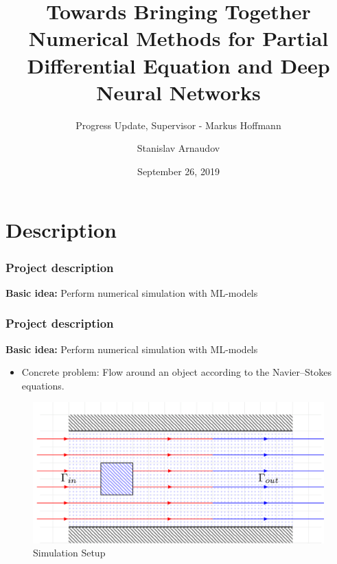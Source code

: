 \documentclass[18pt]{beamer}
\title[Progress Update]{Towards Bringing Together Numerical Methods for Partial Differential Equation and Deep Neural Networks}
\subtitle{Progress Update, Supervisor - Markus Hoffmann}
\author{Stanislav Arnaudov}
\institute{Chair for Computer Architecture and Parallel Processing}
\date{September 26, 2019}
\begin{document}
\begin{frame}
 \titlepage
\end{frame}

\section{Description}

\begin{frame}[t]
  \frametitle{Project description}
  \begin{center}
    \large{\textbf{Basic idea:} Perform numerical simulation with ML-models}
  \end{center}
\end{frame}


\begin{frame}[t]
  \frametitle{Project description}
  \begin{center}
    \large{\textbf{Basic idea:} Perform numerical simulation with ML-models}
  \end{center}
  
  \begin{itemize}
  \item Concrete problem: Flow around an object according to the Navier–Stokes equations.
  \end{itemize}

  \begin{figure}[htb]
    \includegraphics[scale=0.24]{images/channel/flow_2}
    \caption{Simulation Setup}
  \end{figure}
  
\end{frame}
\end{document}

